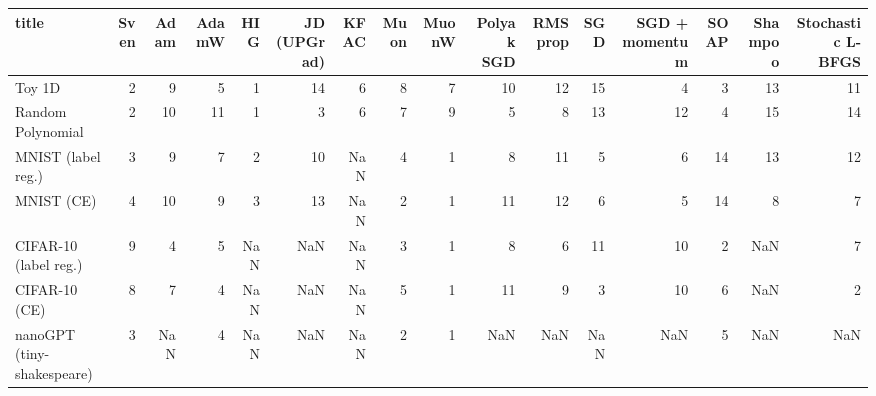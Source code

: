 \begin{tabular}{lrrrrrrrrrrrrrrr}
\toprule
title & Sven & Adam & AdamW & HIG & JD (UPGrad) & KFAC & Muon & MuonW & Polyak SGD & RMSprop & SGD & SGD + momentum & SOAP & Shampoo & Stochastic L-BFGS \\
\midrule
Toy 1D & 2 & 9 & 5 & 1 & 14 & 6 & 8 & 7 & 10 & 12 & 15 & 4 & 3 & 13 & 11 \\
Random Polynomial & 2 & 10 & 11 & 1 & 3 & 6 & 7 & 9 & 5 & 8 & 13 & 12 & 4 & 15 & 14 \\
MNIST (label reg.) & 3 & 9 & 7 & 2 & 10 & NaN & 4 & 1 & 8 & 11 & 5 & 6 & 14 & 13 & 12 \\
MNIST (CE) & 4 & 10 & 9 & 3 & 13 & NaN & 2 & 1 & 11 & 12 & 6 & 5 & 14 & 8 & 7 \\
CIFAR-10 (label reg.) & 9 & 4 & 5 & NaN & NaN & NaN & 3 & 1 & 8 & 6 & 11 & 10 & 2 & NaN & 7 \\
CIFAR-10 (CE) & 8 & 7 & 4 & NaN & NaN & NaN & 5 & 1 & 11 & 9 & 3 & 10 & 6 & NaN & 2 \\
nanoGPT (tiny-shakespeare) & 3 & NaN & 4 & NaN & NaN & NaN & 2 & 1 & NaN & NaN & NaN & NaN & 5 & NaN & NaN \\
\bottomrule
\end{tabular}
